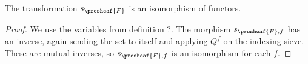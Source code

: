 \begin{lemma}
The transformation $s_{\presheaf{F}}$ is an isomorphism of functors.
\end{lemma}
\begin{proof}
We use the variables from definition ?.
The morphism $s_{\presheaf{F},f}$ has an inverse, 
again sending the set to itself and applying $Q^f$ on the indexing sieve.
These are mutual inverses, 
so $s_{\presheaf{F},f}$ is an isomorphism for each $f$.
\end{proof}
